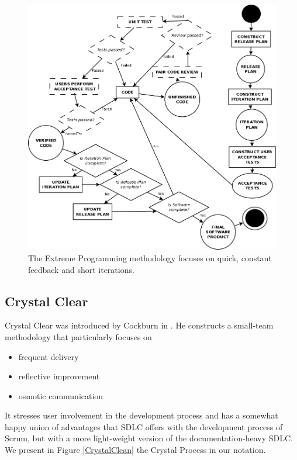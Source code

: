 \begin{figure}
	\centering
	\includegraphics[scale=0.3]{media/EXP}
	\caption{The Extreme Programming methodology focuses on quick, constant feedback and short
		iterations.}
	\label{WindowsXP}
\end{figure}

\subsection{Crystal Clear}
Crystal Clear was introduced by Cockburn in \cite{cockburn2004crystal}.
He constructs a small-team methodology that particularly focuses on
\begin{itemize}
	\item frequent delivery
	\item reflective improvement
	\item osmotic communication
\end{itemize}

It stresses user involvement in the development process and has a somewhat happy union of advantages
that SDLC offers with the development process of Scrum, but with a more light-weight version of the
documentation-heavy SDLC.
We present in Figure \ref{CrystalClean} the Crystal Process in our notation.

